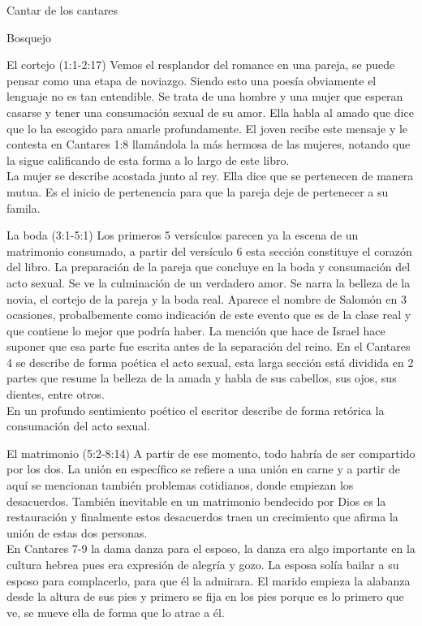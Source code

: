\begin{section}{Cantar de los cantares}
\begin{subsection}{Bosquejo}
		\begin{subsubsection}{El cortejo (1:1-2:17)}
			Vemos el resplandor del romance en una pareja, se puede pensar como una etapa de noviazgo. Siendo esto una poesía obviamente el lenguaje no es tan entendible. Se trata de una hombre y una mujer que esperan casarse y tener una consumación sexual de su amor. Ella habla al amado que dice que lo ha escogido para amarle profundamente. El joven recibe este mensaje y le contesta en Cantares 1:8 llamándola la más hermosa de las mujeres, notando que la sigue calificando de esta forma a lo largo de este libro.\\
			La mujer se describe acostada junto al rey. Ella dice que se pertenecen de manera mutua. Es el inicio de pertenencia para que la pareja deje de pertenecer a su famila. 
		\end{subsubsection}
		\begin{subsubsection}{La boda (3:1-5:1)}
			Los primeros 5 versículos parecen ya la escena de un matrimonio consumado, a partir del versículo 6 esta sección constituye el corazón del libro. La preparación de la pareja que concluye en la boda y consumación del acto sexual. Se ve la culminación de un verdadero amor. Se narra la belleza de la novia, el cortejo de la pareja y la boda real. Aparece el nombre de Salomón en 3 ocasiones, probalbemente como indicación de este evento que es de la clase real y que contiene lo mejor que podría haber. La mención que hace de Israel hace suponer que esa parte fue escrita antes de la separación del reino. En el Cantares 4 se describe de forma poética el acto sexual, esta larga sección está dividida en 2 partes que resume la belleza de la amada y habla de sus cabellos, sus ojos, sus dientes, entre otros.\\
			En un profundo sentimiento poético el escritor describe de forma retórica la consumación del acto sexual.
		\end{subsubsection}
		\begin{subsubsection}{El matrimonio (5:2-8:14)}
			A partir de ese momento, todo habría de ser compartido por los dos. La unión en específico se refiere a una unión en carne y a partir de aquí se mencionan también problemas cotidianos, donde empiezan los desacuerdos. También inevitable en un matrimonio bendecido por Dios es la restauración y finalmente estos desacuerdos traen un crecimiento que afirma la unión de estas dos personas.\\
			En Cantares 7-9 la dama danza para el esposo, la danza era algo importante en la cultura hebrea pues era expresión de alegría y gozo. La esposa solía bailar a su esposo para complacerlo, para que él la admirara. El marido empieza la alabanza desde la altura de sus pies y primero se fija en los pies porque es lo primero que ve, se mueve ella de forma que lo atrae a él. \\

\end{subsubsection}
\end{subsection}
\end{section}
